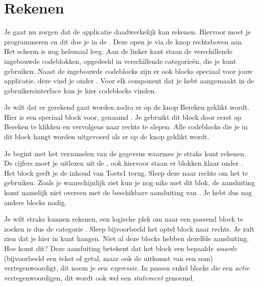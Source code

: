\section{Rekenen}
Je gaat nu zorgen dat de applicatie daadwerkelijk kan rekenen. Hiervoor moet je programmeren en dit doe je in de . Deze open je via de knop  rechtsboven aan.  Het scherm is nog helemaal leeg. Aan de linker kant staan de verschillende ingebouwde codeblokken, opgedeeld in verschillende categorie\"en, die je kunt gebruiken. Naast de ingebouwde codeblocks zijn er ook blocks speciaal voor jouw applicatie, deze vind je onder . Voor elk component dat je hebt aangemaakt in de gebruikersinterface kun je hier codeblocks vinden.

Je wilt dat er gerekend gaat worden zodra er op de knop Bereken geklikt wordt. Hier is een speciaal block voor, genaamd . Je gebruikt dit block door eerst op Bereken te klikken en vervolgens  naar rechts te slepen. Alle codeblocks die je in dit block hangt worden uitgevoerd als er op de knop geklikt wordt.

Je begint met het verzamelen van de gegevens waarmee je straks kunt rekenen. De cijfers moet je uitlezen uit de , ook hiervoor staan er blokken klaar onder . Het block  geeft je de inhoud van Toets1 terug. Sleep deze naar rechts om het te gebruiken. Zoals je waarschijnlijk ziet kun je nog niks met dit blok, de aansluiting komt namelijk niet overeen met de beschikbare aansluiting van . Je hebt dus nog andere blocks nodig.

Je wilt straks kunnen rekenen, een logische plek om naar een passend block te zoeken is dus de categorie . Sleep bijvoorbeeld het optel block naar rechts. Je zult zien dat je hier  in kunt hangen. Niet al deze blocks hebben dezelfde aansluiting. Hoe komt dit? Deze aansluiting betekent dat het block een bepaalde \emph{waarde} (bijvoorbeeld een tekst of getal, maar ook de uitkomst van een som) vertegenwoordigt, dit noem je een \emph{expressie}. In  passen enkel blocks die een \emph{actie} vertegenwoordigen, dit wordt ook wel een \emph{statement} genoemd. 

